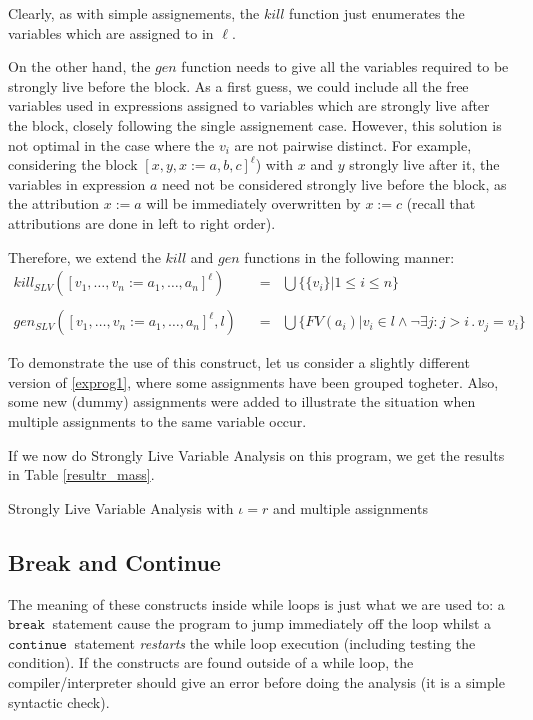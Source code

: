\documentclass[a4wide,12pt]{article}
\def\eq{\;\; = \;\;}
\def\cont {\texttt{continue}\ }
\def\break{\texttt{break}\ }
\def\program#1{\fbox{\begin{minipage}{0.5\textwidth}\protect{$\begin{array}{ll} #1 \end{array}$}\end{minipage}}}
\begin{document}
Clearly, as with simple assignements, the $kill$
function just enumerates the variables which are assigned to in $\ell$.
 
On the other hand, the
$gen$ function needs to give all the variables required to be strongly live before the block.
As a first guess, we could include all the
free variables used in expressions assigned to variables which are strongly live after the block, closely following the
single assignement case. However, this solution is not optimal in the case where the $v_i$ are not pairwise distinct.
For example, considering the block $[x,y,x := a,b,c]^\ell$) with $x$ and $y$ strongly live after it, the variables in expression
$a$ need not be considered strongly live before the block, as the attribution $x:=a$ will be immediately overwritten
by $x:=c$ (recall that attributions are done in left to right order).
 
Therefore, we extend the $kill$ and $gen$ functions in the following manner:
\begin{align*}
kill_{SLV}([v_1,\ldots,v_n := a_1,\ldots,a_n]^\ell) & \eq \bigcup\{\{v_i\} | 1 \leq i\leq n\} \\
\\
gen_{SLV}([v_1,\ldots,v_n := a_1,\ldots,a_n]^\ell,l) & \eq \bigcup\{FV(a_i) | v_i \in l \wedge \neg \exists j : j>i \,.\, v_j = v_i\}
\end{align*}
 
To demonstrate the use of this construct, let us consider a slightly different version of
\ref{exprog1}, where some assignments have been grouped togheter. Also, some new (dummy)
assignments were added to illustrate the situation when multiple assignments to the same
variable occur.

\program{}

If we now do Strongly Live Variable Analysis on this program, we get the results in Table \ref{resultr_mass}.

\begin{table}
\label{resultr_mass}
\caption{Strongly Live Variable Analysis with $\iota = r$ and multiple assignments}
\begin{sideways}

\end{sideways}
\end{table}


 
\subsection{Break and Continue}
The meaning of these constructs inside while loops is just what we are used to:
a $\break$ statement cause the program to jump immediately off the loop whilst
a $\cont$ statement \emph{restarts} the while loop execution (including testing the condition).
If the constructs are found outside of a while loop, the compiler/interpreter should give an error before doing the analysis (it is a simple syntactic check).
 
\end{document}
